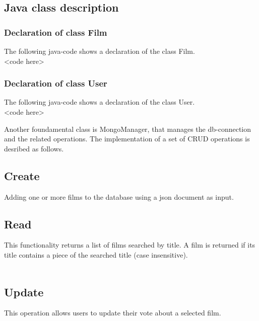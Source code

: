\documentclass[a4paper, oneside]{article}
\begin{document}
\subsection{Java class description}
\subsubsection{Declaration of class Film}
The following java-code shows a declaration of the class Film.
\vspace{2mm}
\\ <code here>
\vspace{5mm}

\subsubsection{Declaration of class User}
The following java-code shows a declaration of the class User.
\vspace{2mm}
	\\ <code here>
\vspace{5mm}

 Another foundamental class is MongoManager, that manages the db-connection and the related operations.
 The implementation of a set of CRUD operations is desribed as follows.


\subsection{Create}
Adding one or more films to the database using a json document as input.
\vspace{2mm}
 \\<Code here>
\vspace{5mm}

\subsection{Read}
This functionality returns a list of films searched by title. A film is returned if its title contains a piece of the searched title (case insensitive).\\
\vspace{2mm}
\\<code here>
\vspace{5mm}

\subsection{Update}
This operation allows users to update their vote about a selected film.\\
\vspace{2mm}
\\<code here>
\vspace{5mm}
\end{document}
